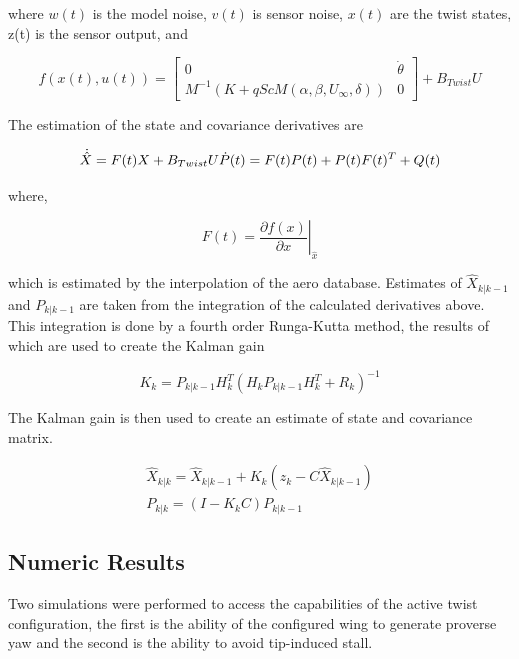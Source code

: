 \documentclass[11pt]{ucthesis}
\begin{document}
where $w(t)$ is the model noise, $v(t)$ is sensor noise, $x(t)$ are the twist states, z(t) is the sensor output, and 

\begin{equation}
f(x(t),u(t)) = \begin{bmatrix}
0&\dot{\theta}\\
M^{-1}(K+qScM(\alpha,\beta,U_{\infty},\delta))&0\end{bmatrix}+B_{Twist}U
\end{equation}

The estimation of the state and covariance derivatives are

\begin{equation}
\dot{\hat{X}} = F(t)X+B_{Twist}U\\
\dot{P}(t) = F(t)P(t)+P(t)F(t)^T+Q(t)
\end{equation}

where,

\begin{equation}
F(t) = \left.\frac{\partial f(x)}{\partial x}\right\vert_{\hat{x}}
\end{equation}

which is estimated by the interpolation of the aero database. Estimates of $\hat{X}_{k\vert k-1}$ and $P_{k\vert k-1}$ are taken from the integration of the calculated derivatives above. This integration is done by a fourth order Runga-Kutta method, the results of which are used to create the Kalman gain

\begin{equation}
K_k = P_{k\vert k-1}H_k^T(H_kP_{k\vert k-1}H_k^T+R_k)^{-1}
\end{equation}

The Kalman gain is then used to create an estimate of state and covariance matrix.

\begin{equation}
\begin{matrix}
\hat{X}_{k\vert k} = \hat{X}_{k\vert k-1} + K_k(z_k-C\hat{X}_{k\vert k-1} )\\
P_{k\vert k} = (I-K_kC)P_{k\vert k-1}
\end{matrix}
\end{equation}

\subsection{Numeric Results}
Two simulations were performed to access the capabilities of the active twist configuration, the first is the ability of the configured wing to generate proverse yaw and the second is the ability to avoid tip-induced stall.
\end{document}
